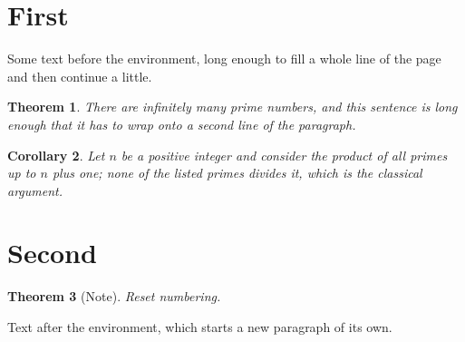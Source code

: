 \documentclass[11pt]{article}
\newtheorem{thm}{Theorem}[section]
\newtheorem{cor}[thm]{Corollary}
\begin{document}
\section{First}
Some text before the environment, long enough to fill a whole line of the page and then continue a little.
\begin{thm}
There are infinitely many prime numbers, and this sentence is long enough that it has to wrap onto a second line of the paragraph.
\end{thm}
\begin{cor}
Let $n$ be a positive integer and consider the product of all primes up to $n$ plus one; none of the listed primes divides it, which is the classical argument.
\end{cor}
\section{Second}
\begin{thm}[Note]
Reset numbering.
\end{thm}
Text after the environment, which starts a new paragraph of its own.
\end{document}
